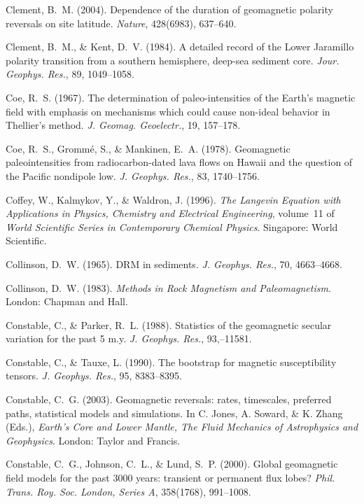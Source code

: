 \documentclass[,plain]{tauxe}
\begin{document}
\begin{thebibliography}{}
\bibitem{}%
Clement, B.~M. (2004).
Dependence of the duration of geomagnetic polarity reversals on site latitude.
{\it Nature}, 428(6983), 637--640.

\bibitem{}%
Clement, B.~M., \& Kent, D.~V. (1984).
A detailed record of the Lower Jaramillo polarity transition from a southern hemisphere, deep-sea sediment core.
{\it Jour. Geophys. Res.}, 89, 1049--1058.

\bibitem{}%
Coe, R.~S. (1967).
The determination of paleo-intensities of the Earth's magnetic field with emphasis on mechanisms which could cause non-ideal behavior in Thellier's method.
{\it J. Geomag. Geoelectr.}, 19, 157--178.

\bibitem{}%
Coe, R.~S., Gromm\'e, S., \& Mankinen, E.~A. (1978).
Geomagnetic paleointensities from radiocarbon-dated lava flows on Hawaii and the question of the Pacific nondipole low.
{\it J. Geophys. Res.}, 83, 1740--1756.

\bibitem{}%
Coffey, W., Kalmykov, Y., \& Waldron, J. (1996).
{\it The Langevin Equation with Applications in Physics, Chemistry and Electrical Engineering}, volume~11 of {\it World Scientific Series in Contemporary Chemical Physics}.
Singapore: World Scientific.

\bibitem{}%
Collinson, D.~W. (1965).
{DRM} in sediments.
{\it J. Geophys. Res.}, 70, 4663--4668.

\bibitem{}%
Collinson, D.~W. (1983).
{\it Methods in Rock Magnetism and Paleomagnetism}.
London: Chapman and Hall.

\bibitem{}%
Constable, C., \& Parker, R.~L. (1988).
Statistics of the geomagnetic secular variation for the past 5 m.y.
{\it J. Geophys. Res.}, 93,--11581.

\bibitem{}%
Constable, C., \& Tauxe, L. (1990).
The bootstrap for magnetic susceptibility tensors.
{\it J. Geophys. Res.}, 95, 8383--8395.

\bibitem{}%
Constable, C.~G. (2003).
Geomagnetic reversals: rates, timescales, preferred paths, statistical models and simulations.
In C. Jones, A. Soward, \& K. Zhang (Eds.), {\it Earth's Core and Lower Mantle, The Fluid Mechanics of Astrophysics and Geophysics}. London: Taylor and Francis.

\bibitem{}%
Constable, C.~G., Johnson, C.~L., \& Lund, S.~P. (2000).
Global geomagnetic field models for the past 3000 years: transient or permanent flux lobes?
{\it Phil. Trans. Roy. Soc. London, Series A}, 358(1768), 991--1008.


\end{thebibliography}
\end{document}

